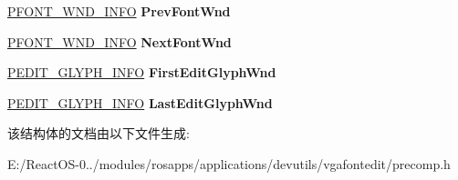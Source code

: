 \begin{DoxyCompactItemize}
\hyperlink{struct___f_o_n_t___w_n_d___i_n_f_o}{P\+F\+O\+N\+T\+\_\+\+W\+N\+D\+\_\+\+I\+N\+FO} {\bfseries Prev\+Font\+Wnd}
\item 
\mbox{\label{struct___f_o_n_t___w_n_d___i_n_f_o_a31912a827c58b702cf63ecd83ef6b43a}} 
\hyperlink{struct___f_o_n_t___w_n_d___i_n_f_o}{P\+F\+O\+N\+T\+\_\+\+W\+N\+D\+\_\+\+I\+N\+FO} {\bfseries Next\+Font\+Wnd}
\item 
\mbox{\label{struct___f_o_n_t___w_n_d___i_n_f_o_a9bcf9250b8d5f0c249b70f41f94cff8c}} 
\hyperlink{struct___e_d_i_t___g_l_y_p_h___i_n_f_o}{P\+E\+D\+I\+T\+\_\+\+G\+L\+Y\+P\+H\+\_\+\+I\+N\+FO} {\bfseries First\+Edit\+Glyph\+Wnd}
\item 
\mbox{\label{struct___f_o_n_t___w_n_d___i_n_f_o_ae60c687bfdaba88361fa557dac021d6e}} 
\hyperlink{struct___e_d_i_t___g_l_y_p_h___i_n_f_o}{P\+E\+D\+I\+T\+\_\+\+G\+L\+Y\+P\+H\+\_\+\+I\+N\+FO} {\bfseries Last\+Edit\+Glyph\+Wnd}
\end{DoxyCompactItemize}


该结构体的文档由以下文件生成\+:\begin{DoxyCompactItemize}
\item 
E\+:/\+React\+O\+S-\/0../modules/rosapps/applications/devutils/vgafontedit/precomp.\+h\end{DoxyCompactItemize}
